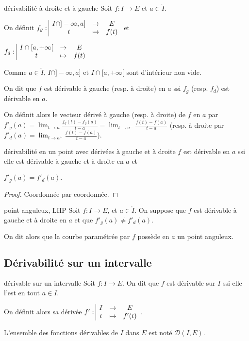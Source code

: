 \documentclass{prepacours}
\begin{document}
\begin{definition}{dérivabilité à droite et à gauche}{}
    Soit $f : I \to E$ et $a \in \mathring I$. 

    \avspace On définit $f_g: \space \begin{array}{|ccc} I \cap ]-\infty, a] & \to & E \\ t & \mapsto & f(t) \end{array}$ et 

    \avspace $f_d: \space \begin{array}{|ccc} I \cap [a, +\infty[ & \to & E \\ t & \mapsto & f(t) \end{array}$

    Comme $a \in \mathring I$, $I \cap ]-\infty, a]$ et $I \cap [a, +\infty[$ 
    sont d'intérieur non vide.

    On dit que $f$ est dérivable à gauche (resp. à droite) en $a$ ssi $f_g$ 
    (resp. $f_d$) est dérivable en $a$.

    On définit alors le vecteur dérivé à gauche (resp. à droite) de $f$ en $a$ par 
    $\displaystyle f'_g(a) = \lim_{t \to a} \frac{f_g(t) - f_g(a)}{t-a} = \lim_{t \to a^-} \frac{f(t) - f(a)}{t-a}$
    (resp. à droite par $\displaystyle f'_d(a) = \lim_{t \to a^+} \frac{f(t) - f(a)}{t-a}$).                                                    
\end{definition}

\begin{proposition}{dérivabilité en un point avec dérivées à gauche et à droite}{}
    $f$ est dérivable en $a$ ssi elle est dérivable à gauche et à droite en $a$ et
    
    $f'_g(a) = f'_d(a)$. 
\end{proposition}

\begin{proof}
    Coordonnée par coordonnée.
\end{proof}

\begin{definition}{point anguleux, LHP}{}
    Soit $f : I \to E$, et $a \in \mathring{I }$. 
    On suppose que $f$ est dérivable à gauche et à droite en $a$ et que 
    $f'_g(a) \neq f'_d(a)$.

    On dit alors que la courbe paramétrée par $f$ possède en $a$ un point anguleux.
\end{definition}

\subsection{Dérivabilité sur un intervalle}

\begin{definition}{dérivable sur un intervalle}{}
    Soit $f : I \to E$. On dit que $f$ est dérivable sur $I$ ssi elle l'est en tout $a \in I$. 

    On définit alors sa dérivée $f': \space \begin{array}{|ccc} I & \to & E \\ t & \mapsto & f'(t) \end{array}$. 

    L'ensemble des fonctions dérivables de $I$ dans $E$ est noté $\mathscr D(I, E)$.
\end{definition}
\end{document}
